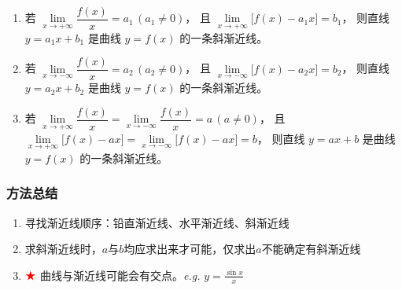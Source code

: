 \documentclass[a4paper,12pt]{article}
\begin{document}
    \begin{enumerate}
        \item 若 $\lim\limits_{x\to +\infty}\dfrac{f(x)}{x}=a_1\,(a_1\neq 0)$，
        且 $\lim\limits_{x\to +\infty}\bigl[f(x)-a_1x\bigr]=b_1$，
        则直线 $y=a_1x+b_1$ 是曲线 $y=f(x)$ 的一条斜渐近线。

        \item 若 $\lim\limits_{x\to -\infty}\dfrac{f(x)}{x}=a_2\,(a_2\neq 0)$，
        且 $\lim\limits_{x\to -\infty}\bigl[f(x)-a_2x\bigr]=b_2$，
        则直线 $y=a_2x+b_2$ 是曲线 $y=f(x)$ 的一条斜渐近线。

        \item 若 $\lim\limits_{x\to +\infty}\dfrac{f(x)}{x}
        =\lim\limits_{x\to -\infty}\dfrac{f(x)}{x}=a\,(a\neq 0)$，
        且 $\lim\limits_{x\to +\infty}\bigl[f(x)-ax\bigr]
        =\lim\limits_{x\to -\infty}\bigl[f(x)-ax\bigr]=b$，
        则直线 $y=ax+b$ 是曲线 $y=f(x)$ 的一条斜渐近线。
    \end{enumerate}

    \subsubsection{方法总结}

    \begin{enumerate}
        \item 寻找渐近线顺序：铅直渐近线、水平渐近线、斜渐近线
        \item 求斜渐近线时，$a$与$b$均应求出来才可能，仅求出$a$不能确定有斜渐近线
        \item $\color{red}{\bigstar}$ 曲线与渐近线可能会有交点。\emph{e.g.} $y = \displaystyle\frac{\sin x}{x}$
        \begin{center}
        \end{center}
    \end{enumerate}
\end{document}
